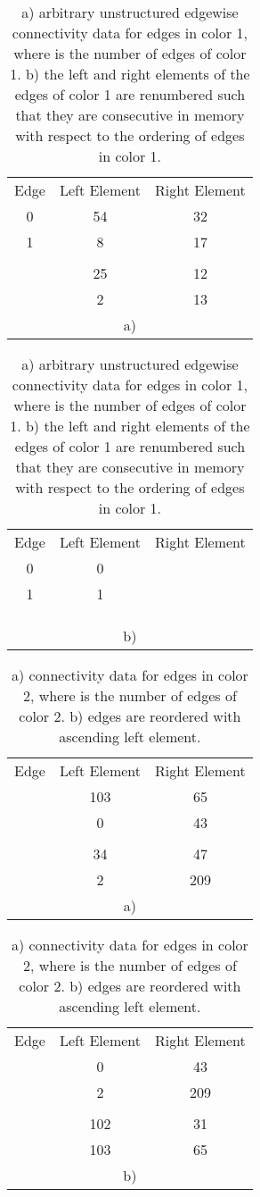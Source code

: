 \documentclass[12pt]{article}
\begin{document}
\begin{table}

	
	\begin{tabular}{c|c|c}
		Edge & Left Element & Right Element \\ 
		\cline{2-3} 0 & 54 & 32 \\ 
		\cline{2-3} 1 & 8 & 17 \\ 
		\cline{2-3}  &  &  \\ 
		\cline{2-3}  & 25 & 12 \\ 
		\cline{2-3}  & 2 & 13 \\ 
		
		\multicolumn{3}{c}{a)}
	\end{tabular} 
	\quad
	\begin{tabular}{c|c|c}
		Edge & Left Element & Right Element \\ 
		\cline{2-3} 0 & 0 &  \\ 
		\cline{2-3} 1 & 1 &  \\ 
		\cline{2-3}  &  &  \\ 
		\cline{2-3}  &  &  \\ 
		\cline{2-3}  &  &  \\
		
		\multicolumn{3}{c}{b)}
	\end{tabular} 
	\caption{a) arbitrary unstructured edgewise connectivity data for edges in color 1, where  is the number of edges of color 1. b) the left and right elements of the edges of color 1 are renumbered such that they are consecutive in memory with respect to the ordering of edges in color 1.}
	\label{tab:connectivity}
\end{table}
\begin{table}

	\begin{tabular}{c|c|c}
		Edge & Left Element & Right Element \\ 
		\cline{2-3}  & 103 & 65 \\ 
		\cline{2-3}  & 0 & 43 \\ 
		\cline{2-3}  &  &  \\ 
		\cline{2-3}  & 34 & 47 \\ 
		\cline{2-3}  & 2 & 209 \\
		
		\multicolumn{3}{c}{a)}
	\end{tabular} 
	\quad
	\begin{tabular}{c|c|c}
		Edge & Left Element & Right Element \\ 
		\cline{2-3}  & 0 & 43 \\ 
		\cline{2-3}  & 2 & 209 \\ 
		\cline{2-3}  &  &  \\ 
		\cline{2-3}  & 102 & 31 \\ 
		\cline{2-3}  & 103 & 65 \\
		
		\multicolumn{3}{c}{b)}
	\end{tabular} 
	
		\caption{a) connectivity data for edges in color 2, where  is the number of edges of color 2. b) edges are reordered with ascending left element.}
		\label{tab:color2}
	
\end{table}
\end{document}
